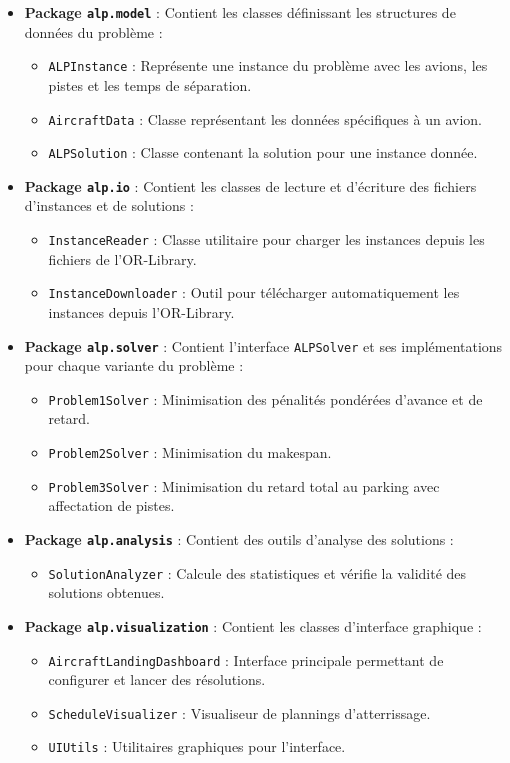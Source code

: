 \documentclass[a4paper,12pt]{report}
\begin{document}
\begin{itemize}
  \item \textbf{Package \texttt{alp.model}} : Contient les classes définissant les structures de données du problème :
    \begin{itemize}
      \item \texttt{ALPInstance} : Représente une instance du problème avec les avions, les pistes et les temps de séparation.
      \item \texttt{AircraftData} : Classe représentant les données spécifiques à un avion.
      \item \texttt{ALPSolution} : Classe contenant la solution pour une instance donnée.
    \end{itemize}
  
  \item \textbf{Package \texttt{alp.io}} : Contient les classes de lecture et d'écriture des fichiers d'instances et de solutions :
    \begin{itemize}
      \item \texttt{InstanceReader} : Classe utilitaire pour charger les instances depuis les fichiers de l'OR-Library.
      \item \texttt{InstanceDownloader} : Outil pour télécharger automatiquement les instances depuis l'OR-Library.
    \end{itemize}
  
  \item \textbf{Package \texttt{alp.solver}} : Contient l'interface \texttt{ALPSolver} et ses implémentations pour chaque variante du problème :
    \begin{itemize}
      \item \texttt{Problem1Solver} : Minimisation des pénalités pondérées d'avance et de retard.
      \item \texttt{Problem2Solver} : Minimisation du makespan.
      \item \texttt{Problem3Solver} : Minimisation du retard total au parking avec affectation de pistes.
    \end{itemize}
  
  \item \textbf{Package \texttt{alp.analysis}} : Contient des outils d'analyse des solutions :
    \begin{itemize}
      \item \texttt{SolutionAnalyzer} : Calcule des statistiques et vérifie la validité des solutions obtenues.
    \end{itemize}
  
  \item \textbf{Package \texttt{alp.visualization}} : Contient les classes d'interface graphique :
    \begin{itemize}
      \item \texttt{AircraftLandingDashboard} : Interface principale permettant de configurer et lancer des résolutions.
      \item \texttt{ScheduleVisualizer} : Visualiseur de plannings d'atterrissage.
      \item \texttt{UIUtils} : Utilitaires graphiques pour l'interface.
    \end{itemize}
\end{itemize}
\end{document}
